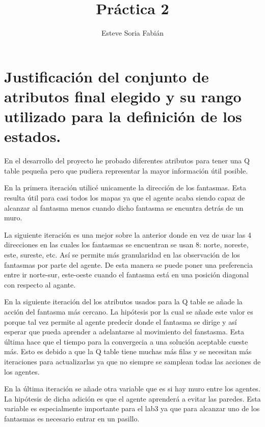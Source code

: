 \documentclass[12pt]{article}
\title{Práctica 2}
\author{Esteve Soria Fabián}
\begin{document}
    \maketitle

    \section{Justificación del conjunto de atributos final elegido y su rango utilizado para la definición de los
    estados.}

    En el desarrollo del proyecto he probado diferentes atributos para tener una
    Q table pequeña pero que pudiera representar la mayor información útil posible.
    \newline

    En la primera iteración utilicé unicamente la dirección de los fantasmas.
    Esta resulta útil para casi todos los mapas ya que el agente acaba siendo capaz
    de alcanzar al fantasma menos cuando dicho fantasma se encuntra detrás de un muro.
    \newline

    La siguiente iteración es una mejor sobre la anterior donde en vez de usar las
    4 direcciones en las cuales los fantasmas se encuentran se usan 8: norte, noreste,
    este, sureste, etc.
    Así se permite más granularidad en las observación de los fantasmas por
    parte del agente.
    De esta manera se puede poner una preferencia entre ir norte-sur, este-oeste cuando el
    fantasma está en una posición diagonal con respecto al agante.
    \newline

    En la siguiente iteración del los atributos usados para la Q table se añade la acción del fantasma más cercano.
    La hipótesis por la cual se añade este valor es porque tal vez permite al agente predecir donde el fantasma se
    dirige y así esperar que pueda aprender a adelantarse al movimiento del fanstasma.
    Esta última hace que el tiempo para la convergecia a una solución aceptable cueste más.
    Esto es debido a que la Q table tiene muchas más filas y se necesitan más iteraciones para
    actualizarlas ya que no siempre se samplean todas las acciones de los agentes.
    \newline

    En la última iteración se añade otra variable que es si hay muro entre los agentes.
    La hipótesis de dicha adición es que el agente aprenderá a evitar las paredes.
    Esta variable es especialmente importante para el lab3 ya que para alcanzar uno de los fantasmas
    es necesario entrar en un pasillo.
\end{document}
